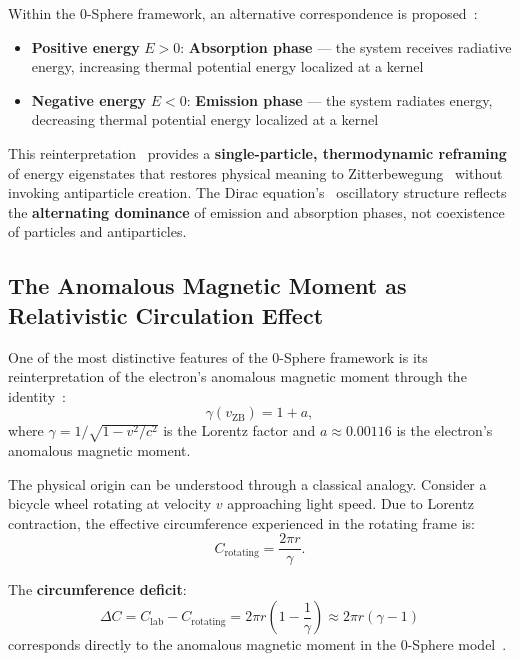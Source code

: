 \documentclass[12pt,letterpaper]{article}
\begin{document}
Within the 0-Sphere framework, an alternative correspondence is proposed~\cite{hanamura17760132}:
\begin{itemize}
\item \textbf{Positive energy} $E > 0$: \textbf{Absorption phase} --- the system receives radiative energy, increasing thermal potential energy localized at a kernel
\item \textbf{Negative energy} $E < 0$: \textbf{Emission phase} --- the system radiates energy, decreasing thermal potential energy localized at a kernel
\end{itemize}

This reinterpretation~\cite{hanamura17760132} provides a \textbf{single-particle, thermodynamic reframing} of energy eigenstates that restores physical meaning to Zitterbewegung~\cite{Schrodinger1930} without invoking antiparticle creation. The Dirac equation's~\cite{Dirac1928} oscillatory structure reflects the \textbf{alternating dominance} of emission and absorption phases, not coexistence of particles and antiparticles.

\subsection{The Anomalous Magnetic Moment as Relativistic Circulation Effect}

One of the most distinctive features of the 0-Sphere framework is its reinterpretation of the electron's anomalous magnetic moment through the identity~\cite{hanamura17765409}:
\begin{equation}
\gamma(v_{\mathrm{ZB}}) = 1 + a,
\end{equation}
where $\gamma = 1/\sqrt{1 - v^2/c^2}$ is the Lorentz factor and $a \approx 0.00116$ is the electron's anomalous magnetic moment.

The physical origin can be understood through a classical analogy. Consider a bicycle wheel rotating at velocity $v$ approaching light speed. Due to Lorentz contraction, the effective circumference experienced in the rotating frame is:
\begin{equation}
C_{\mathrm{rotating}} = \frac{2\pi r}{\gamma}.
\end{equation}

The \textbf{circumference deficit}:
\begin{equation}
\Delta C = C_{\mathrm{lab}} - C_{\mathrm{rotating}} = 2\pi r \left(1 - \frac{1}{\gamma}\right) \approx 2\pi r (\gamma - 1)
\end{equation}
corresponds directly to the anomalous magnetic moment in the 0-Sphere model~\cite{hanamura17765409}.
\end{document}
